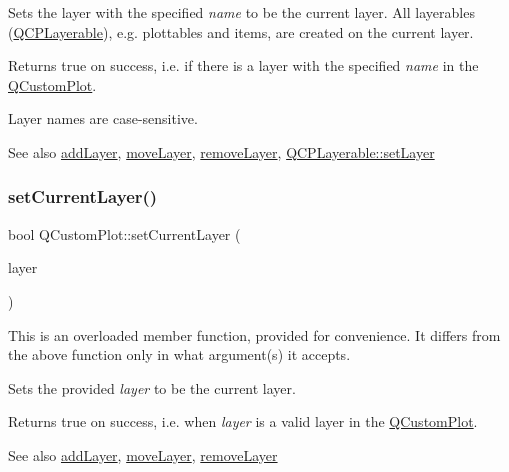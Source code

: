 Sets the layer with the specified {\itshape name} to be the current layer. All layerables (\mbox{\hyperlink{class_q_c_p_layerable}{Q\+C\+P\+Layerable}}), e.\+g. plottables and items, are created on the current layer.

Returns true on success, i.\+e. if there is a layer with the specified {\itshape name} in the \mbox{\hyperlink{class_q_custom_plot}{Q\+Custom\+Plot}}.

Layer names are case-\/sensitive.

\begin{DoxySeeAlso}{See also}
\mbox{\hyperlink{class_q_custom_plot_ad5255393df078448bb6ac83fa5db5f52}{add\+Layer}}, \mbox{\hyperlink{class_q_custom_plot_ae896140beff19424e9e9e02d6e331104}{move\+Layer}}, \mbox{\hyperlink{class_q_custom_plot_a40f75e342c5eaab6a86066a42a0e2a94}{remove\+Layer}}, \mbox{\hyperlink{class_q_c_p_layerable_ab0d0da6d2de45a118886d2c8e16d5a54}{Q\+C\+P\+Layerable\+::set\+Layer}} 
\end{DoxySeeAlso}
\mbox{\label{class_q_custom_plot_a23a4d3cadad1a0063c5fe19aac5659e6}} 
\subsubsection{\texorpdfstring{set\+Current\+Layer()}{setCurrentLayer()}\hspace{0.1cm}{\footnotesize\ttfamily [2/2]}}
{\footnotesize\ttfamily bool Q\+Custom\+Plot\+::set\+Current\+Layer (\begin{DoxyParamCaption}\item[{\mbox{\hyperlink{class_q_c_p_layer}{Q\+C\+P\+Layer}} $\ast$}]{layer }\end{DoxyParamCaption})}

This is an overloaded member function, provided for convenience. It differs from the above function only in what argument(s) it accepts.

Sets the provided {\itshape layer} to be the current layer.

Returns true on success, i.\+e. when {\itshape layer} is a valid layer in the \mbox{\hyperlink{class_q_custom_plot}{Q\+Custom\+Plot}}.

\begin{DoxySeeAlso}{See also}
\mbox{\hyperlink{class_q_custom_plot_ad5255393df078448bb6ac83fa5db5f52}{add\+Layer}}, \mbox{\hyperlink{class_q_custom_plot_ae896140beff19424e9e9e02d6e331104}{move\+Layer}}, \mbox{\hyperlink{class_q_custom_plot_a40f75e342c5eaab6a86066a42a0e2a94}{remove\+Layer}} 
\end{DoxySeeAlso}
\mbox{\label{class_q_custom_plot_a422bf1bc6d56dac75a3d805d9a65902c}} 
